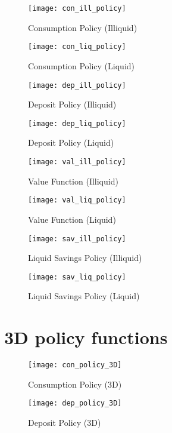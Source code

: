 \documentclass[english]{article}
\begin{document}
\begin{multicols}{2}

\begin{figure}[H]
\protect\caption{Consumption Policy (Illiquid)}
\centering{}
\texttt{[image: con\_ill\_policy]}
\end{figure}

\begin{figure}[H]
\protect\caption{Consumption Policy (Liquid)}
\centering{}
\texttt{[image: con\_liq\_policy]}
\end{figure}

\begin{figure}[H]
\protect\caption{Deposit Policy (Illiquid)}
\centering{}
\texttt{[image: dep\_ill\_policy]}
\end{figure}

\begin{figure}[H]
\protect\caption{Deposit Policy (Liquid)}
\centering{}
\texttt{[image: dep\_liq\_policy]}
\end{figure}

\begin{figure}[H]
\protect\caption{Value Function (Illiquid)}
\centering{}
\texttt{[image: val\_ill\_policy]}
\end{figure}

\begin{figure}[H]
\protect\caption{Value Function (Liquid)}
\centering{}
\texttt{[image: val\_liq\_policy]}
\end{figure}

\begin{figure}[H]
\protect\caption{Liquid Savings Policy (Illiquid)}
\centering{}
\texttt{[image: sav\_ill\_policy]}
\end{figure}

\begin{figure}[H]
\protect\caption{Liquid  Savings Policy (Liquid)}
\centering{}
\texttt{[image: sav\_liq\_policy]}
\end{figure}

\end{multicols}
\newpage
\section{3D policy functions}


\begin{figure}[H]
\protect\caption{Consumption Policy (3D)}
\centering{}
\texttt{[image: con\_policy\_3D]}
\end{figure}

\begin{figure}[H]
\protect\caption{Deposit Policy (3D)}
\centering{}
\texttt{[image: dep\_policy\_3D]}
\end{figure}


\end{document}
